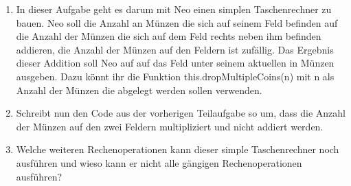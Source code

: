 
\begin{enumerate}
    \item In dieser Aufgabe geht es darum mit Neo einen simplen Taschenrechner zu bauen. Neo soll die Anzahl an Münzen die sich auf seinem Feld befinden auf die Anzahl der Münzen die sich auf dem Feld rechts neben ihm befinden addieren, die Anzahl der Münzen auf den Feldern ist zufällig. Das Ergebnis dieser Addition soll Neo auf auf das Feld unter seinem aktuellen in Münzen ausgeben. Dazu könnt ihr die Funktion this.dropMultipleCoins(n) mit n als Anzahl der Münzen die abgelegt werden sollen verwenden. 

    \item Schreibt nun den Code aus der vorherigen Teilaufgabe so um, dass die Anzahl der Münzen auf den zwei Feldern multipliziert und nicht addiert werden.
    
    \item Welche weiteren Rechenoperationen kann dieser simple Taschenrechner noch ausführen und wieso kann er nicht alle gängigen Rechenoperationen ausführen?
\end{enumerate}
